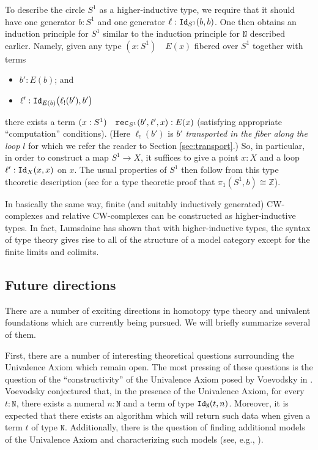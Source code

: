 \documentclass{amsart}
\newcommand{\iso}{\cong}
\newcommand{\id}[1]{\textnormal{\texttt{Id}}_{#1}}
\newcommand{\nat}{\mathtt{N}}
\newcommand{\rec}{\textnormal{\texttt{rec}}}
\newcommand{\judge}[2]{(#1)\quad #2}
\theoremstyle{definition}
\theoremstyle{remark}
\numberwithin{equation}{section}
\begin{document}
To describe the circle $S^{1}$ as a higher-inductive type, we require
that it should have one generator $b : S^{1}$ and one generator
$\ell:\id{S^{1}}(b,b)$.  One then obtains an induction principle for
$S^{1}$ similar to the induction principle for $\nat$ described
earlier.  Namely, given any type $\judge{x:S^{1}}{E(x)}$ fibered over
$S^{1}$ together with terms
\begin{itemize}
\item $b':E(b)$; and
\item $\ell':\id{E(b)}\bigl(\ell_{!}(b'),b'\bigr)$
\end{itemize}
there exists a term $\judge{x:S^{1}}{\rec_{S^{1}}(b',\ell',x):E(x)}$
(satisfying appropriate ``computation'' conditions).  (Here
$\ell_{!}(b')$ is $b'$ \emph{transported in the fiber along the loop $l$}
for which we refer the reader to Section \ref{sec:transport}.)  So, in
particular, in order to construct a map $S^{1}\to X$, it suffices to
give a point $x:X$ and a loop $\ell':\id{X}(x,x)$ on $x$.  The usual
properties of $S^{1}$ then follow from this type theoretic description
(see \cite{Shulman:S1Z} for a type theoretic proof that $\pi_{1}(S^{1},b)\iso\mathbb{Z}$).

In basically the same way, finite (and suitably inductively generated)
CW-complexes and relative CW-complexes can be constructed as
higher-inductive types.  In fact, Lumsdaine \cite{Lumsdaine:MSHIT} has shown that
with higher-inductive types, the syntax of type theory gives rise to
all of the structure of a model category except for the finite
limits and colimits.

\subsection{Future directions}

There are a number of exciting directions in homotopy type theory and
univalent foundations which are currently being pursued.  We will
briefly summarize several of them.

First, there are a number of interesting theoretical questions
surrounding the Univalence Axiom which remain open.  The most pressing
of these questions is the question of the ``constructivity'' of the
Univalence Axiom posed by Voevodsky in \cite{Vo2012}.  Voevodsky
conjectured that, in the presence of the Univalence Axiom, for every
$t:\nat$, there exists a numeral $n:\nat$ and a term of type
$\id{\nat}(t,n)$.  Moreover, it is expected that there exists an
algorithm which will return such data when given a term $t$ of type
$\nat$.  Additionally, there is the question of finding additional
models of the Univalence Axiom and characterizing such models (see,
e.g., \cite{Shulman:UAID}).
\end{document}
